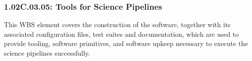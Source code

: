 \subsubsection*{1.02C.03.05: Tools for Science Pipelines}

This WBS element covers the construction of the software, together with its
associated configuration files, test suites and documentation, which are used
to provide tooling, software primitives, and software upkeep necessary to execute
the science pipelines successfully.
